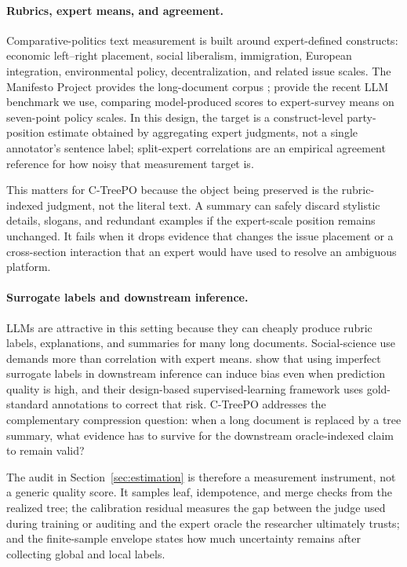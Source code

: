 \paragraph{Rubrics, expert means, and agreement.}
Comparative-politics text measurement is built around expert-defined
constructs: economic left--right placement, social liberalism, immigration,
European integration, environmental policy, decentralization, and related
issue scales. The Manifesto Project provides the long-document corpus
\citep{ManifestoProject2025a}; \citet{BenoitEtAl2025} provide the recent
LLM benchmark we use, comparing model-produced scores to expert-survey
means on seven-point policy scales. In this design, the target is a
construct-level party-position estimate obtained by aggregating expert
judgments, not a single annotator's sentence label; split-expert
correlations are an empirical agreement reference for how noisy that
measurement target is.

This matters for C-TreePO because the object being preserved is the
rubric-indexed judgment, not the literal text. A summary can safely discard
stylistic details, slogans, and redundant examples if the expert-scale
position remains unchanged. It fails when it drops evidence that changes
the issue placement or a cross-section interaction that an expert would
have used to resolve an ambiguous platform.

\paragraph{Surrogate labels and downstream inference.}
LLMs are attractive in this setting because they can cheaply produce
rubric labels, explanations, and summaries for many long documents.
Social-science use demands more than correlation with expert means.
\citet{EgamiEtAl2024} show that using imperfect surrogate
labels in downstream inference can induce bias even when prediction
quality is high, and their design-based supervised-learning framework
uses gold-standard annotations to correct that risk. C-TreePO addresses
the complementary compression question: when a long document is replaced
by a tree summary, what evidence has to survive for the downstream
oracle-indexed claim to remain valid?

The audit in Section~\ref{sec:estimation} is therefore a measurement
instrument, not a generic quality score. It samples leaf, idempotence, and
merge checks from the realized tree; the calibration residual measures the
gap between the judge used during training or auditing and the expert
oracle the researcher ultimately trusts; and the finite-sample envelope
states how much uncertainty remains after collecting global and local
labels.

